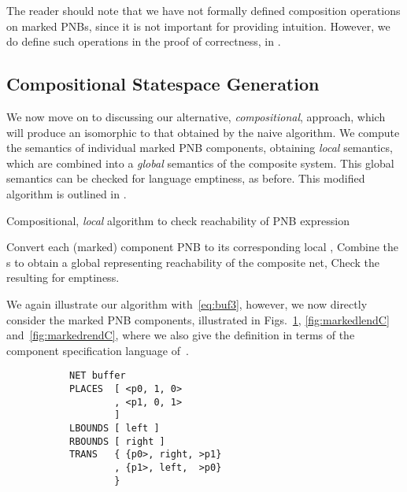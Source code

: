 \begin{remark}\label{rem:compositionMarkedPNB}
    The reader should note that we have not formally defined composition
    operations on marked PNBs, since it is not important for providing
    intuition. However, we do define such operations in the proof of
    correctness, in .
\end{remark}

\subsection{Compositional Statespace Generation}

We now move on to discussing our alternative, \emph{compositional}, approach,
which will produce an isomorphic \TNFA{} to that obtained by the naive
algorithm. We compute the \TNFA{} semantics of individual marked PNB
components, obtaining \emph{local} \TNFA{} semantics, which are combined into a
\emph{global} \TNFA{} semantics of the composite system. This global semantics
can be checked for language emptiness, as before. This modified algorithm is
outlined in .

\begin{algorithm}[ht]
    \caption{Compositional, \emph{local} algorithm to check reachability of PNB expression}\label{alg:compositionalAlgorithm}
\label{alg:PNBAlgorithm}
    \begin{algorithmic}[1]
        \State{}\label{step:comp1}Convert each (marked) component PNB to its
            corresponding local \TNFA,
        \State{}\label{step:comp2}Combine the \TNFA{}s to obtain a global
            \TNFA{} representing reachability of the composite net,
        \State{}\label{step:comp3}Check the resulting \TNFA{} for emptiness.
    \end{algorithmic}
\end{algorithm}

We again illustrate our algorithm with~\ref{eq:buf3}, however, we now directly
consider the marked PNB components, illustrated in
Figs.~\ref{fig:markedbufferC}, \ref{fig:markedlendC} and~\ref{fig:markedrendC},
where we also give the definition in terms of the component specification
language of~.

\begin{figure}[ht]
\centering
\begin{subfigure}{0.5\textwidth}
    \centering
    \usebox{\bufferBox}
\end{subfigure}%
\begin{subfigure}{0.5\textwidth}
    \centering
\begin{lstlisting}
NET buffer
PLACES  [ <p0, 1, 0>
        , <p1, 0, 1>
        ]
LBOUNDS [ left ]
RBOUNDS [ right ]
TRANS   { {p0>, right, >p1}
        , {p1>, left,  >p0}
        }
\end{lstlisting}
\end{subfigure}%
\caption{\bufferC{} }
\label{fig:markedbufferC}
\end{figure}

